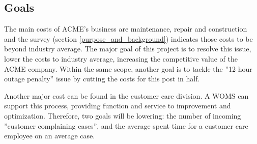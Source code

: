 \subsection{Goals}
The main costs of ACME's business are maintenance, repair and construction and the survey (section \ref{purpose_and_background}) indicates those costs to be beyond industry average. The major goal of this project is to resolve this issue, lower the costs to industry average, increasing the competitive value of the ACME company. Within the same scope, another goal is to tackle the ''12 hour outage penalty'' issue by cutting the costs for this post in half.

Another major cost can be found in the customer care division. A WOMS \cite{appendixB} can support this process, providing function and service to improvement and optimization. Therefore, two goals will be lowering: the number of incoming ”customer complaining cases”, and the average spent time for a customer care employee on an average case.